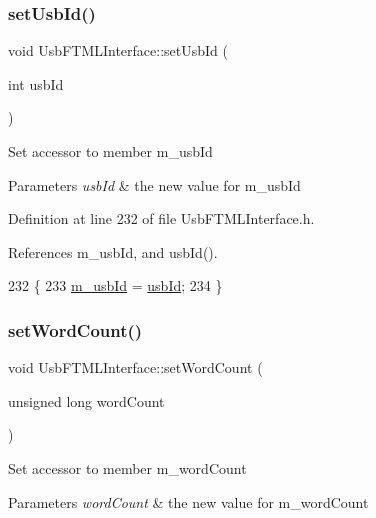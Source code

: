 \subsubsection{\texorpdfstring{set\+Usb\+Id()}{setUsbId()}}
{\footnotesize\ttfamily void Usb\+F\+T\+M\+L\+Interface\+::set\+Usb\+Id (\begin{DoxyParamCaption}\item[{int}]{usb\+Id }\end{DoxyParamCaption})\hspace{0.3cm}{\ttfamily [inline]}}

Set accessor to member m\+\_\+usb\+Id 
\begin{DoxyParams}{Parameters}
{\em usb\+Id} & the new value for m\+\_\+usb\+Id \\
\hline
\end{DoxyParams}


Definition at line 232 of file Usb\+F\+T\+M\+L\+Interface.\+h.



References m\+\_\+usb\+Id, and usb\+Id().


\begin{DoxyCode}
232                             \{
233     \hyperlink{classUsbFTMLInterface_aab6754587c303660d5c498ce34a2b4c8}{m\_usbId} = \hyperlink{classUsbFTMLInterface_a99016c7661780ed89195dc507d3516fc}{usbId};
234   \}
\end{DoxyCode}
\mbox{\label{classUsbFTMLInterface_a3061389b73d2c2be1d53007723f9280e}} 
\subsubsection{\texorpdfstring{set\+Word\+Count()}{setWordCount()}}
{\footnotesize\ttfamily void Usb\+F\+T\+M\+L\+Interface\+::set\+Word\+Count (\begin{DoxyParamCaption}\item[{unsigned long}]{word\+Count }\end{DoxyParamCaption})\hspace{0.3cm}{\ttfamily [inline]}}

Set accessor to member m\+\_\+word\+Count 
\begin{DoxyParams}{Parameters}
{\em word\+Count} & the new value for m\+\_\+word\+Count \\
\hline
\end{DoxyParams}


